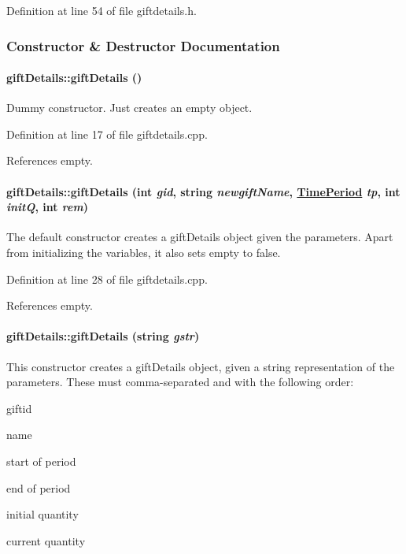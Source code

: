 Definition at line 54 of file giftdetails.h.

\subsubsection{Constructor \& Destructor Documentation}
\hypertarget{classgiftDetails_giftDetailsa0}{
\paragraph[giftDetails]{\setlength{\rightskip}{0pt plus 5cm}gift\-Details::gift\-Details ()}\hfill}
\label{classgiftDetails_giftDetailsa0}


Dummy constructor. Just creates an empty object. 

Definition at line 17 of file giftdetails.cpp.

References empty.\hypertarget{classgiftDetails_giftDetailsa1}{
\paragraph[giftDetails]{\setlength{\rightskip}{0pt plus 5cm}gift\-Details::gift\-Details (int {\em gid}, string {\em newgift\-Name}, \hyperlink{classTimePeriod}{Time\-Period} {\em tp}, int {\em init\-Q}, int {\em rem})}\hfill}
\label{classgiftDetails_giftDetailsa1}


The default constructor creates a gift\-Details object given the parameters. Apart from initializing the variables, it also sets empty to false. 

Definition at line 28 of file giftdetails.cpp.

References empty.\hypertarget{classgiftDetails_giftDetailsa2}{
\paragraph[giftDetails]{\setlength{\rightskip}{0pt plus 5cm}gift\-Details::gift\-Details (string {\em gstr})}\hfill}
\label{classgiftDetails_giftDetailsa2}


This constructor creates a gift\-Details object, given a string representation of the parameters. These must comma-separated and with the following order:\begin{CompactItemize}
\item 
giftid\item 
name\item 
start of period\item 
end of period\item 
initial quantity\item 
current quantity \end{CompactItemize}


